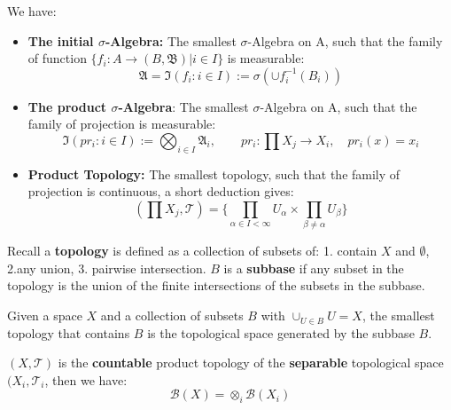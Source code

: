 \begin{definition}
	We have:
	\begin{itemize}
		\item\textbf{The initial $\sigma$-Algebra: } The smallest $\sigma$-Algebra on A, such that the family of function $\{f_i : A \rightarrow  (B, \mathfrak{B})| i \in I\}$ is measurable:
			\begin{equation*}
				\mathfrak{A} = \mathfrak{I}(f_i: i \in I) := \sigma(\cup f_i^{-1}(B_i) )
			\end{equation*} 
		\item \textbf{The product $\sigma$-Algebra}:
			The smallest $\sigma$-Algebra on A, such that the family of projection is measurable:
			\begin{equation*}
				\mathfrak{I}(pr_i: i \in I) := \bigotimes_{i \in I} \mathfrak{A}_i , \qquad pr_i: \prod X_j \rightarrow X_i, \quad  pr_i(x) = x_i
			\end{equation*}
		\item \textbf{Product Topology:} The smallest topology, such that the family of projection is continuous, a short deduction gives:
			\begin{equation*}
				(\prod X_j, \mathcal{T}) = \{ \prod_{\alpha \in I <\infty}  U_\alpha \times \prod_{\beta \neq \alpha} U_\beta \}
			\end{equation*}
	\end{itemize}
\end{definition}

\begin{remark}
Recall a \textbf{topology} is defined as a collection of subsets of: 1. contain $X$ and $\emptyset$, 2.any union, 3. pairwise intersection. 
 $B$ is a \textbf{subbase} if any subset in the topology is the union of the finite intersections of the subsets in the subbase. \par 
Given a space $X$ and a collection of subsets $B$ with $\cup_{U \in B} U = X$, the smallest topology that contains $B$ is the topological space generated by the subbase $B$.	
\end{remark}

\begin{theorem}
	$(X, \mathcal{T})$ is the \textbf{countable} product topology of the \textbf{separable} topological space $(X_i, \mathcal{T}_i$, then we have:
	\begin{equation*}
		\mathcal{B}(X) = \otimes_i \mathcal{B}(X_i)
	\end{equation*}
\end{theorem}

